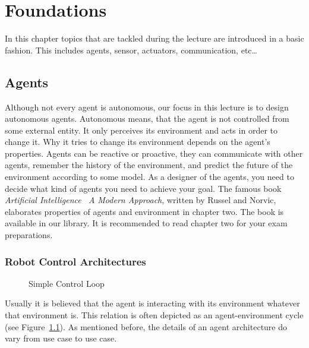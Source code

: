 \chapter{Foundations}
\label{chap:foundations}

In this chapter topics that are tackled during the lecture are introduced in a basic fashion. This includes agents, sensor, actuators, communication, etc\dots

\section{Agents}
\label{sec:agents}

Although not every agent is autonomous, our focus in this lecture is to design autonomous agents. Autonomous means, that the agent is not controlled from some external entity. It only perceives its environment and acts in order to change it. Why it tries to change its environment depends on the agent's properties. Agents can be reactive or proactive, they can communicate with other agents, remember the history of the environment, and predict the future of the environment according to some model. As a designer of the agents, you need to decide what kind of agents you need to achieve your goal. The famous book \emph{Artificial Intelligence \textendash\ A Modern Approach}, written by Russel and Norvic, elaborates properties of agents and environment in chapter two. The book is available in our library. It is recommended to read chapter two for your exam preparations.

\subsection{Robot Control Architectures}
\label{ssec:robotcontrolarch}

\begin{figure}[htbp]
  \centering
  \caption{Simple Control Loop}
  \label{fig:simplecontrolloop}
\end{figure}

Usually it is believed that the agent is interacting with its environment \textendash whatever that environment is. This relation is often depicted as an agent-environment cycle (see Figure~\ref{fig:simplecontrolloop}). As mentioned before, the details of an agent architecture do vary from use case to use case.

